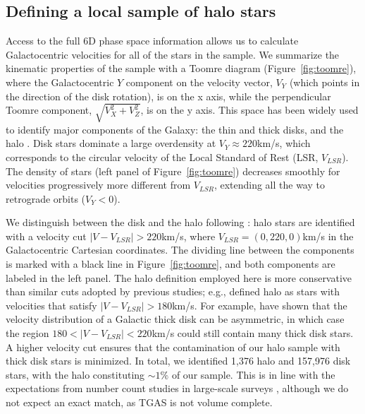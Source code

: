 \documentclass[apj, twocolappendix, numberedappendix, appendixfloats]{emulateapj}
\begin{document}
\subsection{Defining a local sample of halo stars}
\label{sec:sample}
Access to the full 6D phase space information allows us to calculate Galactocentric velocities for all of the stars in the sample.
We summarize the kinematic properties of the sample with a Toomre diagram (Figure~\ref{fig:toomre}), where the Galactocentric $Y$ component on the velocity vector, $V_Y$ (which points in the direction of the disk rotation), is on the x axis, while the perpendicular Toomre component, $\sqrt{V_X^2+V_Z^2}$, is on the y axis. 
This space has been widely used to identify major components of the Galaxy: the thin and thick disks, and the halo \citep[e.g.,][]{venn2004}.
Disk stars dominate a large overdensity at $V_Y\approx220$\;km/s, which corresponds to the circular velocity of the Local Standard of Rest (LSR, $V_{LSR}$).
The density of stars (left panel of Figure~\ref{fig:toomre}) decreases smoothly for velocities progressively more different from $V_{LSR}$, extending all the way to retrograde orbits ($V_Y<0$).

We distinguish between the disk and the halo following \citet{ns2010}: halo stars are identified with a velocity cut $|V-V_{LSR}|>220$\;km/s, where $V_{LSR} = (0,220,0)$\;km/s in the Galactocentric Cartesian coordinates.
The dividing line between the components is marked with a black line in Figure~\ref{fig:toomre}, and both components are labeled in the left panel.
The halo definition employed here is more conservative than similar cuts adopted by previous studies; e.g., \citet{ns2010} defined halo as stars with velocities that satisfy $|V-V_{LSR}|>180$\;km/s.
For example, \citet{sb2009} have shown that the velocity distribution of a Galactic thick disk can be asymmetric, in which case the region $180<|V-V_{LSR}|<220$\;km/s could still contain many thick disk stars.
A higher velocity cut ensures that the contamination of our halo sample with thick disk stars is minimized.
In total, we identified 1,376 halo and 157,976 disk stars, with the halo constituting $\sim1\%$ of our sample.
This is in line with the expectations from number count studies in large-scale surveys \citep[e.g.,][]{juric2008}, although we do not expect an exact match, as TGAS is not volume complete.
\end{document}
